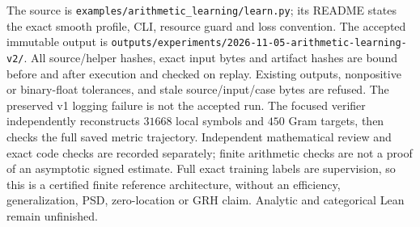 \documentclass[11pt]{article}
\theoremstyle{definition}\newtheorem{definition}[theorem]{Definition}
\theoremstyle{remark}\newtheorem{remark}[theorem]{Remark}
\begin{document}
The source is \texttt{examples/}\allowbreak\texttt{arithmetic\_learning/}\allowbreak\texttt{learn.py}; its README
states the exact smooth profile, CLI, resource guard and loss convention.
The accepted immutable output is
\texttt{outputs/experiments/}\allowbreak\texttt{2026-11-05-arithmetic-learning-v2/}.
All source/helper hashes, exact input bytes and artifact hashes are bound
before and after execution and checked on replay. Existing outputs,
nonpositive or binary-float tolerances, and stale source/input/case bytes
are refused. The preserved v1 logging failure is not the accepted run.
The focused verifier independently reconstructs $31668$ local symbols and
$450$ Gram targets, then checks the full saved metric trajectory.
Independent mathematical review and exact code checks are recorded separately;
finite arithmetic checks are not a proof of an asymptotic signed estimate.
Full exact training labels are supervision, so this is a certified finite
reference architecture, without an efficiency, generalization, PSD,
zero-location or GRH claim. Analytic and categorical Lean remain unfinished.
\end{document}
